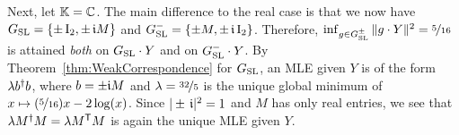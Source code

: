 \begin{example}
	\medskip
	
	Next, let $\mathbb K = \mathbb C$. The main difference to the real case is that we now have $G_{\operatorname{SL}} = \{\pm \operatorname{I}_2, \pm \, \mathfrak{i} M\}$ and $G_{\operatorname{SL}}^{-} = \{\pm M, \pm \, \mathfrak{i} \operatorname{I}_2\}$. Therefore, $\inf_{g \in G_{\operatorname{SL}}^{\pm}} \| g \cdot Y\|^2 = \nicefrac{5}{16}$ is attained \emph{both} on $G_{\operatorname{SL}} \cdot Y$ and on $G_{\operatorname{SL}}^{-} \cdot Y$. By Theorem~\ref{thm:WeakCorrespondence} for $G_{\operatorname{SL}}$, an MLE given $Y$ is of the form $\lambda b^{\dagger} b$, where $b = \pm \mathfrak{i} M$ and $\lambda = \nicefrac{32}{5}$ is the unique global minimum of $x \mapsto (\nicefrac{5}{16})x - 2\log(x)$. Since $| \pm \, \mathfrak{i} |^2 = 1$ and $M$ has only real entries, we see that $\lambda M ^{\dagger} M = \lambda M^{\mathsf{T}} M$ is again the unique MLE given $Y$.
	\hfill\exSymbol
\end{example}



















